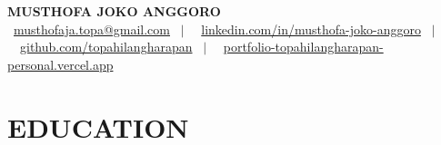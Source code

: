 \documentclass[10pt,a4paper]{article}
\newcommand{\contactline}[1]{\small #1}
\begin{document}
\begin{center}
    {\LARGE \textbf{MUSTHOFA JOKO ANGGORO}} \\[2pt]
    \contactline{
        \faEnvelope\ \href{mailto:musthofaja.topa@gmail.com}{musthofaja.topa@gmail.com} \ $|$ \ 
        \faLinkedin\ \href{https://www.linkedin.com/in/musthofa-joko-anggoro/}{linkedin.com/in/musthofa-joko-anggoro} \ $|$ \
        \faGithub\ \href{https://github.com/topahilangharapan}{github.com/topahilangharapan} \ $|$ \
        \faGlobe\ \href{https://portfolio-topahilangharapan-personal.vercel.app/}{portfolio-topahilangharapan-personal.vercel.app}
    }
\end{center}

\vspace{-10pt}


\section*{EDUCATION}
\end{document}
